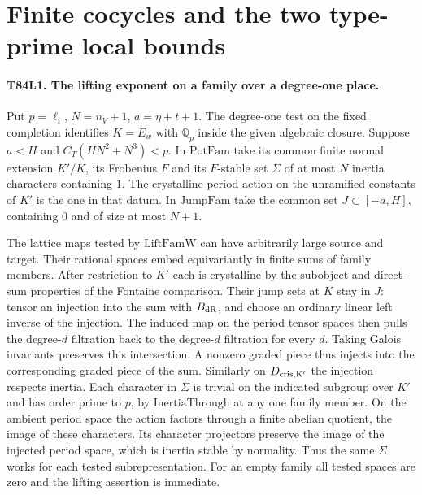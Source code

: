 \section{Finite cocycles and the two type-prime local bounds}

\paragraph{T84L1. The lifting exponent on a family over a degree-one place.}
Put $p=\ell_i$, $N=n_V+1$, $a=\eta+t+1$. The degree-one test on
the fixed completion identifies $K=E_w$ with $\mathbb Q_p$ inside
the given algebraic closure. Suppose $a<H$ and
$C_T(HN^2+N^3)<p$. In $\mathrm{PotFam}$ take its common finite
normal extension $K'/K$, its Frobenius $F$ and its $F$-stable
set $\Sigma$ of at most $N$ inertia characters containing $1$.
The crystalline period action on the unramified constants of $K'$
is the one in that datum. In $\mathrm{JumpFam}$ take the common
set $J\subset[-a,H]$, containing $0$ and of size at most $N+1$.

The lattice maps tested by $\mathrm{LiftFamW}$ can have arbitrarily
large source and target. Their rational spaces embed equivariantly
in finite sums of family members. After restriction to $K'$ each
is crystalline by the subobject and direct-sum properties of the
Fontaine comparison. Their jump sets at $K$ stay in $J$: tensor
an injection into the sum with $B_{\rm dR}$, and choose an
ordinary linear left inverse of the injection. The induced map
on the period tensor spaces then pulls the degree-$d$ filtration
back to the degree-$d$ filtration for every $d$. Taking Galois
invariants preserves this intersection. A nonzero graded
piece thus injects into the corresponding graded piece of the sum.
Similarly on $D_{\rm cris,K'}$ the injection respects inertia.
Each character in $\Sigma$ is trivial on the indicated subgroup
over $K'$ and has order prime to $p$, by $\mathrm{InertiaThrough}$
at any one family member. On the ambient period space the
action factors through a finite abelian quotient, the image of
these characters. Its character projectors preserve the image
of the injected period space, which is inertia stable by
normality. Thus the same $\Sigma$ works for each tested
subrepresentation. For an empty family all tested spaces are
zero and the lifting assertion is immediate.

